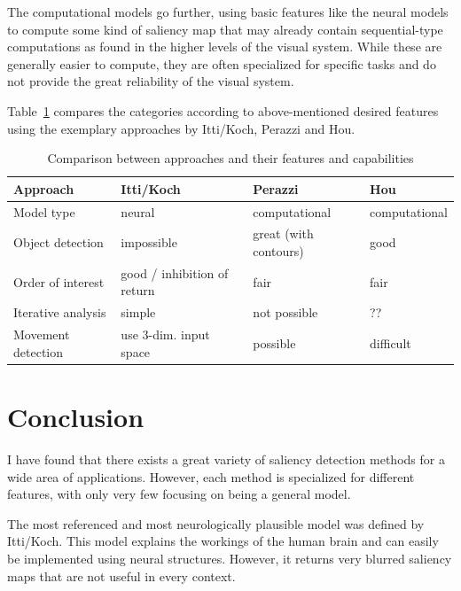 \documentclass[a4paper,12pt,fleqn,oneside]{scrartcl}
\begin{document}
The computational models go further, using basic features like the neural models to compute some kind of saliency map
that may already contain sequential-type computations as found in the higher levels of the visual system. While these
are generally  easier to compute, they are often specialized for specific tasks and do not provide the great reliability
of the visual system.

Table~\ref{tbl:comparison} compares the categories according to above-mentioned desired features using the exemplary
approaches by Itti/Koch, Perazzi and Hou.

\begin{table}[hbt]
    \scriptsize
    {
    \def\arraystretch{1.5}
    \begin{tabularx}{\textwidth}{lXXX}
    \hline
    \textbf{Approach}
        & \textbf{Itti/Koch} 
        & \textbf{Perazzi}
        & \textbf{Hou} \\ 
    \hline
    Model type
        & neural
        & computational
        & computational \\
    \hline
    Object detection     
        & impossible              
        & great (with contours)
        & good \\
    Order of interest     
        & good / inhibition of return              
        & fair
        & fair \\
    Iterative analysis  
        & simple
        & not possible
        & ?? \\
    Movement detection      
        & use 3-dim. input space
        & possible
        & difficult \\
    \hline
    \end{tabularx}
    }

    \caption{Comparison between approaches and their features and capabilities}
    \label{tbl:comparison}
\end{table}

\section{Conclusion}

I have found that there exists a great variety of saliency detection methods for a wide area of applications. However,
each method is specialized for different features, with only very few focusing on being a general model.

The most referenced and most neurologically plausible model was defined by Itti/Koch. This model explains the workings
of the human brain and can easily be implemented using neural structures. However, it returns very blurred saliency maps
that are not useful in every context.
\end{document}
